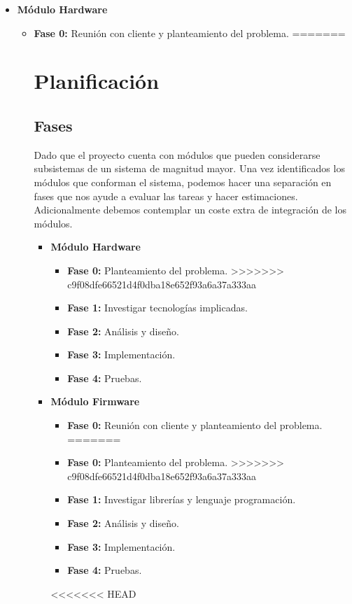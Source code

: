 \begin{itemize}
	
	\item \textbf{Módulo Hardware}
	\begin{itemize}
		\item \textbf{Fase 0:} Reunión con cliente y planteamiento del problema.
=======
\chapter{Planificación}

\section{Fases}

Dado que el proyecto cuenta con módulos que pueden considerarse subsistemas de un sistema de magnitud mayor. 
Una vez identificados los módulos que conforman el sistema, podemos hacer una separación en fases que nos ayude a evaluar las tareas y
hacer estimaciones. Adicionalmente debemos contemplar un coste extra de integración de los módulos.

\begin{itemize}
	
	\item \textbf{ Módulo Hardware}
	\begin{itemize}
		\item \textbf{Fase 0:} Planteamiento del problema.
>>>>>>> c9f08dfe66521d4f0dba18e652f93a6a37a333aa
		\item \textbf{Fase 1:} Investigar tecnologías implicadas.
		\item \textbf{Fase 2:} Análisis y diseño.
		\item \textbf{Fase 3:} Implementación.
		\item \textbf{Fase 4:} Pruebas.
	\end{itemize}
	
	\item \textbf{Módulo Firmware}
	\begin{itemize}
<<<<<<< HEAD
		\item \textbf{Fase 0:} Reunión con cliente y planteamiento del problema.
=======
		\item \textbf{Fase 0:} Planteamiento del problema.
>>>>>>> c9f08dfe66521d4f0dba18e652f93a6a37a333aa
		\item \textbf{Fase 1:} Investigar librerías y lenguaje programación.
		\item \textbf{Fase 2:} Análisis y diseño.
		\item \textbf{Fase 3:} Implementación.
		\item \textbf{Fase 4:} Pruebas.
	\end{itemize}
<<<<<<< HEAD


\end{itemize}
\end{itemize}
\end{itemize}
